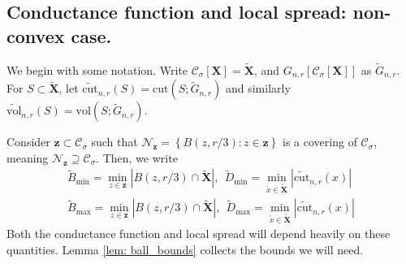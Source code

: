\documentclass{article}
\newcommand{\set}[1]{\left\{#1\right\}}
\newcommand{\vol}{\mathrm{vol}}
\newcommand{\abs}[1]{\left \lvert #1 \right \rvert}
\newcommand{\1}{\mathbf{1}}
\newcommand{\cut}{\mathrm{cut}}
\newcommand{\zbf}{\mathbf{z}}
\newcommand{\Xbf}{\mathbf{X}}
\newcommand{\Cset}{\mathcal{C}}
\newcommand{\Csig}{\Cset_{\sigma}}
\newcommand{\wX}{\widetilde{\Xbf}}
\newcommand{\wx}{\widetilde{x}}
\theoremstyle{aldenthm}
\begin{document}
\subsection{Conductance function and local spread: non-convex case.}

We begin with some notation. Write $\Csig[\Xbf] = \wX$, and $G_{n,r}[\Csig[\Xbf]]$ as $\widetilde{G}_{n,r}$. For $S \subset \wX$, let $\widetilde{\cut}_{n,r}(S) = \cut(S;\widetilde{G}_{n,r})$ and similarly $\widetilde{\vol}_{n,r}(S) = \vol(S;\widetilde{G}_{n,r})$. 

Consider $\zbf \subset \Csig$ such that  $\mathcal{N}_{\zbf} = \set{B(z,r/3): z \in \zbf}$ is a covering of $\Csig$, meaning $\mathcal{N}_{\zbf} \supseteq \Csig$. Then, we write
\begin{align*}
\widetilde{B}_{\min} = \min_{z \in \zbf} \abs{B(z,r/3) \cap \wX}, ~~
\widetilde{D}_{\min} = \min_{\wx \in \wX} \abs{\widetilde{\cut}_{n,r}(x)} \\ \widetilde{B}_{\max} = \min_{z \in \zbf} \abs{B(z,r/3) \cap \wX}, ~~
\widetilde{D}_{\max} = \min_{\wx \in \wX} \abs{\widetilde{\cut}_{n,r}(x)}
\end{align*}
Both the conductance function and local spread will depend heavily on these quantities. Lemma \ref{lem: ball_bounds} collects the bounds we will need.
\end{document}
